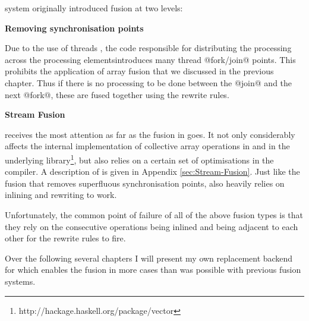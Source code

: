 \documentclass[preamble.tex]{subfiles}
\begin{document}
\DPH system originally introduced fusion at two levels:
\begin{description}
\label{list:DPH-fusion-levels}
\item \textbf{Removing synchronisation points}

Due to the use of \Haskell threads \cite{Jones08atutorial}, the code responsible for distributing the processing across the processing elements\ipe introduces many thread @fork/join@ points. This prohibits the application of array fusion that we discussed in the previous chapter. Thus if there is no processing to be done between the @join@ and the next @fork@, these are fused together using the rewrite rules\irwrules \cite{PTH01}.

\item \textbf{Stream Fusion}

\istreamfusion receives the most attention as far as the fusion in \DPH goes. It not only considerably affects the internal implementation of collective array operations in \DPH and in the underlying  library\footnote{http://hackage.haskell.org/package/vector}, but also relies on a certain set of optimisations in the compiler. A description of  is given in Appendix \ref{sec:Stream-Fusion}. Just like the fusion that removes superfluous synchronisation points,  also heavily relies on inlining and rewriting to work.
\end{description}

Unfortunately, the common point of failure of all of the above fusion types is that they rely on the consecutive operations being inlined and being adjacent to each other for the rewrite rules to fire. 

Over the following several chapters I will present my own replacement backend for  which enables the fusion in more cases than was possible with previous fusion systems.


\IfNotCompilingAll{}
\end{document}
